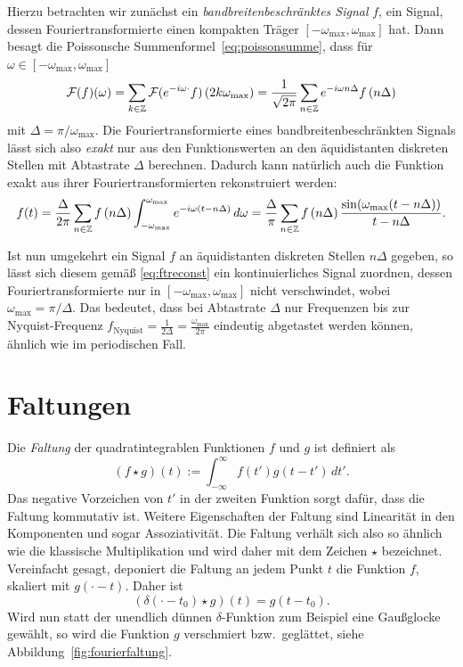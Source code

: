 Hierzu betrachten wir zunächst ein \emph{bandbreitenbeschränktes
  Signal} $f$, \dh ein Signal, dessen Fouriertransformierte einen
kompakten Träger $[-\omega_\text{max},\omega_\text{max}]$ hat. Dann besagt die
Poissonsche Summenformel~\eqref{eq:poissonsumme}, dass für
$\omega\in[-\omega_\text{max},\omega_\text{max}]$
\begin{equation}
  \mathcal F(f)(\omega) =
  \sum_{k\in\mathbb{Z}}\mathcal F(e^{-i\omega \cdot} f)\left(2k\omega_\text{max}\right)
  =
  \frac{1}{\sqrt{2\pi}}
  \sum_{n\in\mathbb{Z}} e^{-i \omega n \Delta}f\left(n \Delta\right)
\end{equation}
mit $\Delta=\pi/\omega_\text{max}$. Die Fouriertransformierte eines
bandbreitenbeschränkten Signals lässt sich also \emph{exakt} nur aus
den Funktionswerten an den äquidistanten diskreten Stellen mit
Abtastrate $\Delta$ berechnen. Dadurch kann natürlich auch die
Funktion exakt aus ihrer Fouriertransformierten rekonstruiert werden:
\begin{equation}
  \label{eq:ftreconst}
  f(t)
  = \frac{\Delta}{2\pi}\sum_{n\in\mathbb{Z}} f\left(n \Delta\right)
  \int_{-\omega_\text{max}}^{\omega_\text{max}} e^{-i \omega (t - n\Delta)} \,d\omega
  = \frac{\Delta}{\pi}\sum_{n\in\mathbb{Z}} f\left(n \Delta\right)
  \frac{\sin(\omega_\text{max}(t-n\Delta))}{t-n\Delta}.
\end{equation}

Ist nun umgekehrt ein Signal $f$ an äquidistanten diskreten Stellen
$n\Delta$ gegeben, so lässt sich diesem gemäß \eqref{eq:ftreconst} ein
kontinuierliches Signal zuordnen, dessen Fouriertransformierte nur in
$[-\omega_\text{max},\omega_\text{max}]$ nicht verschwindet, wobei $\omega_\text{max} =
\pi/\Delta$. Das bedeutet, dass bei Abtastrate $\Delta$ nur Frequenzen
bis zur Nyquist-Frequenz $f_\text{Nyquist}=\frac{1}{2\Delta} =
\frac{\omega_\text{max}}{2\pi}$ eindeutig abgetastet werden können, ähnlich wie
im periodischen Fall.

\section{Faltungen}

Die \emph{Faltung} der quadratintegrablen Funktionen $f$ und $g$ ist
definiert als
\begin{equation}
  (f \star g)(t) := \int_{-\infty}^{\infty} f(t')g(t-t')\,dt'.
\end{equation}
Das negative Vorzeichen von $t'$ in der zweiten Funktion sorgt
dafür, dass die Faltung kommutativ ist. Weitere Eigenschaften der
Faltung sind Linearität in den Komponenten und sogar
Assoziativität. Die Faltung verhält sich also so ähnlich wie die
klassische Multiplikation und wird daher mit dem Zeichen $\star$
bezeichnet.  Vereinfacht gesagt, deponiert die Faltung an jedem Punkt
$t$ die Funktion $f$, skaliert mit $g(\cdot - t) $. Daher ist \zb
\begin{equation}
  (\delta(\cdot - t_0) \star g)(t) = g(t - t_0).
\end{equation}
Wird nun statt der unendlich dünnen $\delta$-Funktion zum Beispiel
eine Gaußglocke gewählt, so wird die Funktion $g$ verschmiert
bzw.\ geglättet, siehe Abbildung~\ref{fig:fourierfaltung}.

